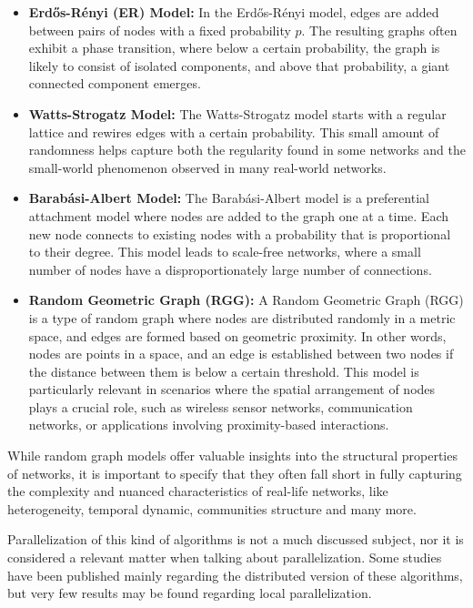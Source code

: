 \documentclass[titlepage]{article}
\begin{document}
\begin{itemize}
    \item \textbf{Erdős-Rényi (ER) Model:} In the Erdős-Rényi model, edges are added between pairs of nodes with a fixed probability $p$. The resulting graphs often exhibit a phase transition, where below a certain probability, the graph is likely to consist of isolated components, and above that probability, a giant connected component emerges.
    \item \textbf{Watts-Strogatz Model:} The Watts-Strogatz model starts with a regular lattice and rewires edges with a certain probability. This small amount of randomness helps capture both the regularity found in some networks and the small-world phenomenon observed in many real-world networks.
    \item \textbf{Barabási-Albert  Model:} The Barabási-Albert model is a preferential attachment model where nodes are added to the graph one at a time. Each new node connects to existing nodes with a probability that is proportional to their degree. This model leads to scale-free networks, where a small number of nodes have a disproportionately large number of connections.
    \item \textbf{Random Geometric Graph (RGG):} A Random Geometric Graph (RGG) is a type of random graph where nodes are distributed randomly in a metric space, and edges are formed based on geometric proximity. In other words, nodes are points in a space, and an edge is established between two nodes if the distance between them is below a certain threshold. This model is particularly relevant in scenarios where the spatial arrangement of nodes plays a crucial role, such as wireless sensor networks, communication networks, or applications involving proximity-based interactions.
\end{itemize}

While random graph models offer valuable insights into the structural properties of networks, it is important to specify that they often fall short in fully capturing the complexity and nuanced characteristics of real-life networks, like heterogeneity, temporal dynamic, communities structure and many more.

Parallelization of this kind of algorithms is not a much discussed subject, nor it is considered a relevant matter when talking about parallelization. Some studies have been published mainly regarding the distributed version of these algorithms, but very few results may be found regarding local parallelization.
\end{document}
